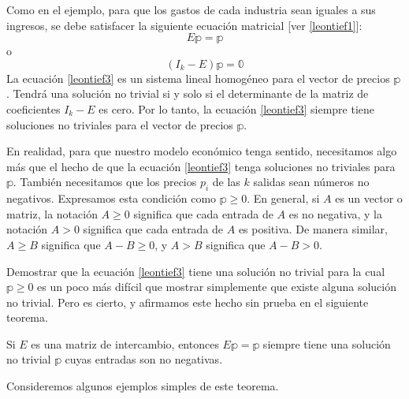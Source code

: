Como en el ejemplo, para que los gastos de cada industria sean iguales a sus ingresos, se debe satisfacer la siguiente ecuación matricial [ver \eqref{leontief1}]:
\begin{equation}
    E \mathbb{p} = \mathbb{p} \label{leontief2}
\end{equation}
o
\begin{equation}
    (I_k - E) \mathbb{p} = \mathbb{0} \label{leontief3}
\end{equation}\newpage\noindent
La ecuación \eqref{leontief3} es un sistema lineal homogéneo para el vector de precios $\mathbb{p}$. Tendrá una solución no trivial si y solo si el determinante de la matriz de coeficientes $I_k - E$ es cero. Por lo tanto, la ecuación \eqref{leontief3} siempre tiene soluciones no triviales para el vector de precios $\mathbb{p}$.

En realidad, para que nuestro modelo económico tenga sentido, necesitamos algo más que el hecho de que la ecuación \eqref{leontief3} tenga soluciones no triviales para $\mathbb{p}$. También necesitamos que los precios $p_i$ de las $k$ salidas sean números no negativos. Expresamos esta condición como $\mathbb{p} \geq 0$. En general, si $A$ es un vector o matriz, la notación $A \geq 0$ significa que cada entrada de $A$ es no negativa, y la notación $A > 0$ significa que cada entrada de $A$ es positiva. De manera similar, $A \geq B$ significa que $A - B \geq 0$, y $A > B$ significa que $A - B > 0$.

Demostrar que la ecuación \eqref{leontief3} tiene una solución no trivial para la cual $\mathbb{p} \geq 0$ es un poco más difícil que mostrar simplemente que existe alguna solución no trivial. Pero es cierto, y afirmamos este hecho sin prueba en el siguiente teorema.

\begin{theorem}{}{}
    Si $E$ es una matriz de intercambio, entonces $E\mathbb{p} = \mathbb{p}$ siempre tiene una solución no trivial $\mathbb{p}$ cuyas entradas son no negativas.
\end{theorem}

Consideremos algunos ejemplos simples de este teorema.

